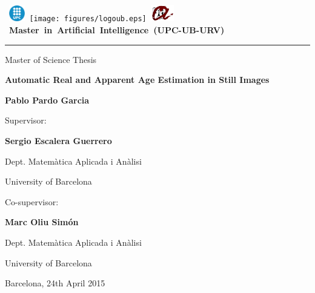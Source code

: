 \thispagestyle{empty}
\vspace*{-2cm}

\hbox{
\includegraphics[width=0.7cm]{figures/logoupc.eps}
\texttt{[image: figures/logoub.eps]}
\includegraphics[width=1cm]{figures/logourv.eps}
\Large \bf Master in Artificial Intelligence (UPC-UB-URV)}
\hrule

\bigskip\bigskip\bigskip

\begin{center}

{\LARGE Master of Science Thesis}

\bigskip\bigskip\bigskip\bigskip\bigskip

\textbf{\huge \bf Automatic Real and Apparent Age Estimation in Still Images}

\bigskip\bigskip\bigskip\bigskip\bigskip

{\LARGE \bf Pablo Pardo Garcia}

\vspace*{5cm}

\begin{multicols}{2}
{\large Supervisor:}

\medskip\medskip\smallskip

{\Large\bf Sergio Escalera Guerrero}

\medskip\medskip

{\Large Dept. Matemàtica Aplicada i Anàlisi}

\medskip

{\Large University of Barcelona}


\bigskip\bigskip\bigskip

{\large Co-supervisor:}

\medskip\medskip\smallskip

{\Large\bf Marc Oliu Simón}

\medskip\medskip

{\Large Dept. Matemàtica Aplicada i Anàlisi}

\medskip

{\Large University of Barcelona}
\end{multicols}

\medskip\medskip\medskip\medskip\medskip

{\Large Barcelona, 24th April 2015}

\end{center}


